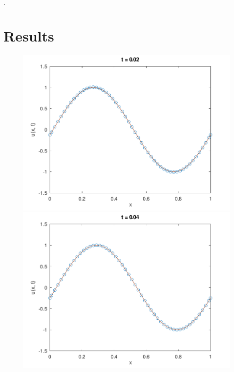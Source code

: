 \documentclass[
	8pt,
	professionalfonts,
	leqno,
	intlimits,
	c,
    aspectratio=1610,
]{beamer}
\begin{document}
\begin{frame}
    .
\end{frame}

\section{Results}

\begin{frame}
    \begin{figure}[H]
        \centering
        \includegraphics[width=.4\paperwidth]{../examples/octave/hyperbolic1D1.pdf}
        \includegraphics[width=.4\paperwidth]{../examples/octave/hyperbolic1D2.pdf}


\end{figure}
\end{frame}
\end{document}
